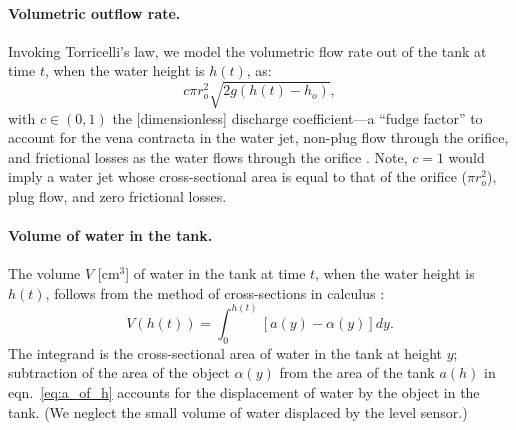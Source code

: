 \documentclass[openacc]{rsproca_new}%
\begin{document}
\paragraph{Volumetric outflow rate.}
Invoking Torricelli's law, we model the volumetric flow rate out of the tank at time $t$, when the water height is $h(t)$, as:
\begin{equation}
	c \pi r_o^2 \sqrt{2 g(h(t)-h_o)}, \label{eq:outletflow}
\end{equation}
with $c\in(0,1)$ the [dimensionless] discharge coefficient---a ``fudge factor'' to account for the vena contracta in the water jet, non-plug flow through the orifice, and frictional losses as the water flows through the orifice \cite{horsch2020simple,teoman2022discharge,hicks2014determining,blasone2015discharge,lienhard1984velocity,wadhwa2021study}. 
Note, $c=1$ would imply a water jet whose cross-sectional area is equal to that of the orifice ($\pi r_o^2$), plug flow, and zero frictional losses.

\paragraph{Volume of water in the tank.} 
The volume $V$ [cm$^3$] of water in the tank at time $t$, when the water height is $h(t)$, follows from the method of cross-sections in calculus \cite{debook}:
\begin{equation}
	V(h(t))=\int_0^{h(t)} \left[a(y) - \alpha(y) \right] dy. \label{eq:volume}
\end{equation}
The integrand is the cross-sectional area of water in the tank at height $y$; subtraction of the area of the object $\alpha(y)$ from the area of the tank $a(h)$ in eqn.~\ref{eq:a_of_h} accounts for the displacement of water by the object in the tank. 
(We neglect the small volume of water displaced by the level sensor.)
\end{document}
